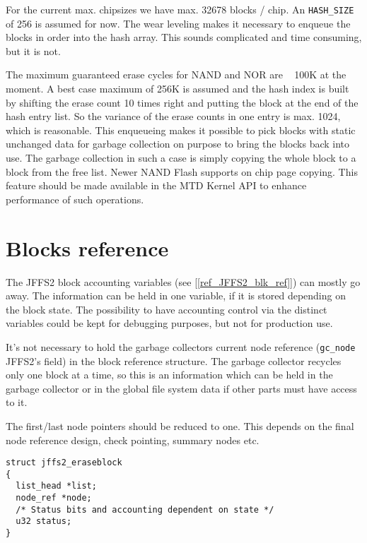 \documentclass[12pt,a4paper,oneside,titlepage]{article}
\begin{document}
For the current max. chipsizes we have max. 32678 blocks / chip. An
\texttt{HASH\_SIZE} of 256 is assumed for now. The wear leveling makes it
necessary to enqueue the blocks in order into the hash array. This
sounds complicated and time consuming, but it is not.

The maximum guaranteed erase cycles for NAND and NOR are ~ 100K at the
moment. A best case maximum of 256K is assumed and the hash index is
built by shifting the erase count 10 times right and putting the block
at the end of the hash entry list. So the variance of the erase counts
in one entry is max. 1024, which is reasonable. This enqueueing makes
it possible to pick blocks with static unchanged data for garbage
collection on purpose to bring the blocks back into use. The garbage
collection in such a case is simply copying the whole block to a block
from the free list. Newer NAND Flash supports on chip page
copying. This feature should be made available in the MTD Kernel API
to enhance performance of such operations.

%
%
\section{Blocks reference}

The JFFS2 block accounting variables (see [\ref{ref_JFFS2_blk_ref}])
can mostly go away. The information can be held in one variable, if it
is stored depending on the block state. The possibility to have
accounting control via the distinct variables could be kept for
debugging purposes, but not for production use.

It's not necessary to hold the garbage collectors current node
reference (\texttt{gc\_node} JFFS2's field) in the block reference
structure. The garbage collector recycles only one block at a time, so
this is an information which can be held in the garbage collector or
in the global file system data if other parts must have access to it.

The first/last node pointers should be reduced to one. This depends on the
final node reference design, check pointing, summary nodes etc.

\begin{verbatim}
struct jffs2_eraseblock
{
  list_head *list;
  node_ref *node;
  /* Status bits and accounting dependent on state */
  u32 status; 
}
\end{verbatim}
\end{document}
